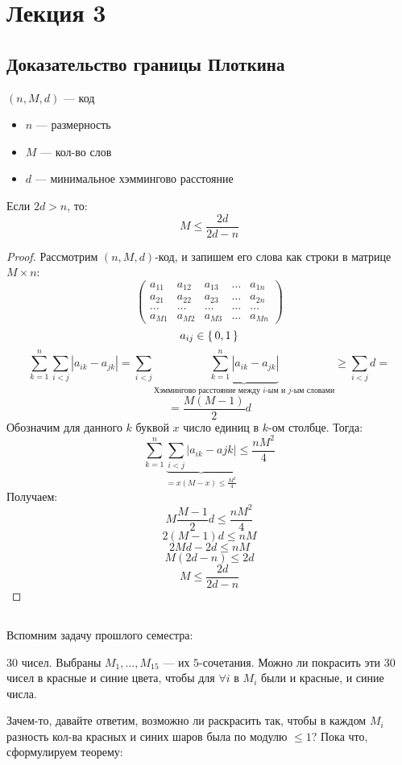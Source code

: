 \section{Лекция 3}
\subsection{Доказательство границы Плоткина}
$(n, M, d)$ --- код
\begin{itemize}
  \item $n$ --- размерность
  \item $M$ --- кол-во слов
  \item $d$ --- минимальное хэммингово расстояние
\end{itemize}
\begin{theorem}[Плоткина]
\label{theorem:03_1}
Если $2d > n$, то:
  \[
  M \leq \frac{2d}{2d - n}
  \]
\end{theorem}
\begin{proof}
  Рассмотрим $(n, M, d)$-код, и запишем его слова как строки в матрице $M \times n$:
  \[
    \begin{pmatrix} a_{11} & a_{12} & a_{13} & \ldots & a_{1n} \\ a_{21} & a_{22} & a_{23} & \ldots & a_{2n} \\ \ldots & \ldots & \ldots & \ldots & \ldots \\ a_{M1} & a_{M 2} & a_{M 3} & \ldots & a_{Mn}\end{pmatrix}
  \]
  \[
  a_{ij} \in \set{0, 1}
  \]
  \[
  \sum_{k = 1}^{n} \sum_{i < j}^{} \left|a_{ik} - a_{j k}\right| = \sum_{i < j}^{} \underbrace{\sum_{k = 1}^{n} \left|a_{ik} - a_{j k}\right|}_{\text{Хэммингово расстояние между $i$-ым и $j$-ым словами}} \geq \sum_{i < j}^{} d = 
  \]
  \[
   = \frac{M(M - 1)}{2} d
  \]
  Обозначим для данного $k$ буквой $x$ число единиц в $k$-ом столбце.  Тогда:
  \[
  \sum_{k = 1}^{n} \underbrace{\sum_{i < j}^{} \left|a_{ik} - a{j k}\right|}_{= x (M - x) \leq \frac{M^{2}}{4}} \leq \frac{nM^{2}}{4}
  \]
  Получаем:
  \[
  M\frac{M - 1}{2}d \leq \frac{nM^{2}}{4}
  \]
  \[
  2(M - 1)d \leq nM
  \]
  \[
  2Md - 2d \leq nM
  \]
  \[
  M(2d - n) \leq 2d
  \]
  \[
  M \leq \frac{2d}{2d - n}
  \]
\end{proof}

\subsection{}
Вспомним задачу прошлого семестра:
\begin{task}
  $30$ чисел. Выбраны $M_1, \ldots, M_{15}$ --- их $5$-сочетания. Можно ли покрасить эти $30$ чисел в красные и синие цвета, чтобы для $\forall i$ в $M_i$ были и красные, и синие числа.
\end{task}
Зачем-то, давайте ответим, возможно ли раскрасить так, чтобы в каждом $M_i$ разность кол-ва красных и синих шаров была по модулю $\leq 1$? Пока что, сформулируем теорему:

